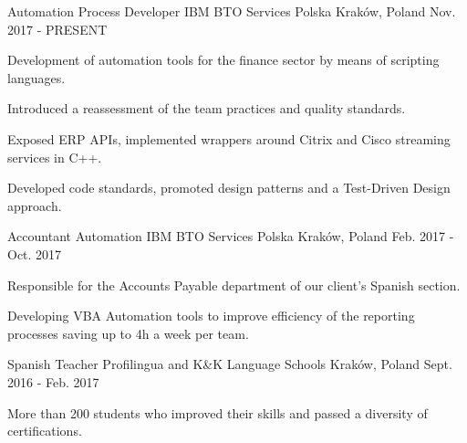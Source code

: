 

\begin{cventries}

  \cventry
    {Automation Process Developer} %
    {IBM BTO Services Polska} %
    {Kraków, Poland} %
    {Nov. 2017 - PRESENT} %
    {
      \begin{cvitems} %
        \item {Development of automation tools for the finance sector by means of scripting languages.}
        \item {Introduced a reassessment of the team practices and quality standards.}
		\item {Exposed ERP APIs, implemented wrappers around Citrix and Cisco streaming services in C++.}
        \item {Developed code standards, promoted design patterns and a Test-Driven Design approach.}
      \end{cvitems}
    }

  \cventry
    {Accountant Automation} %
    {IBM BTO Services Polska} %
	{Kraków, Poland} %
	{Feb. 2017 - Oct. 2017} %
    {
      \begin{cvitems} %
        \item {Responsible for the Accounts Payable department of our client's Spanish section.}
        \item {Developing VBA Automation tools to improve efficiency of the reporting processes saving up to 4h a week per team.}
      \end{cvitems}
    }

  \cventry
    {Spanish Teacher} %
    {Profilingua and K\&K Language Schools} %
	{Kraków, Poland} %
	{Sept. 2016 - Feb. 2017} %
    {
      \begin{cvitems} %
        \item {More than 200 students who improved their skills and passed a diversity of certifications.}
      \end{cvitems}
    }

\end{cventries}
